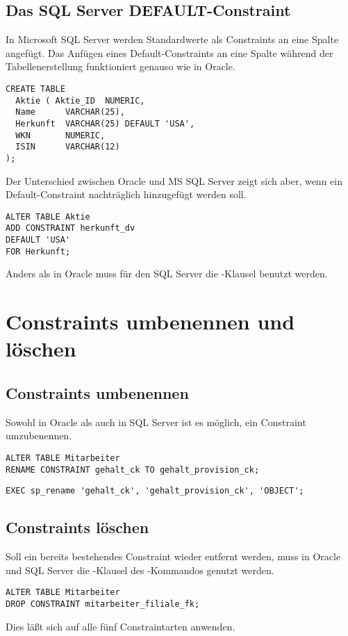       \subsection{Das SQL Server DEFAULT-Constraint}
        In Microsoft SQL Server werden Standardwerte als Constraints an eine
        Spalte angefügt. Das Anfügen eines Default-Constraints an eine Spalte
        während der Tabellenerstellung funktioniert genauso wie in Oracle.
          \begin{lstlisting}[language=ms_sql,caption={Erstellen
          einer Tabelle mit einem Standardwert},label=sql09_18a]
CREATE TABLE
  Aktie ( Aktie_ID  NUMERIC,
  Name      VARCHAR(25),
  Herkunft  VARCHAR(25) DEFAULT 'USA',
  WKN       NUMERIC,
  ISIN      VARCHAR(12)
);
          \end{lstlisting}
          Der Unterschied zwischen Oracle und MS SQL Server zeigt sich aber, wenn ein Default-Constraint nachträglich hinzugefügt werden soll.
          \begin{lstlisting}[language=ms_sql,caption={Tabellenspalte mit
          Standardwert hinzufügen in SQL Server},label=sql09_18b] 
ALTER TABLE Aktie
ADD CONSTRAINT herkunft_dv
DEFAULT 'USA'
FOR Herkunft;
          \end{lstlisting}
          Anders als in Oracle muss für den SQL Server die -Klausel benutzt werden.
    \section{Constraints umbenennen und löschen}
      \subsection{Constraints umbenennen}
        Sowohl in Oracle als auch in SQL Server ist es möglich, ein Constraint umzubenennen.
        \begin{lstlisting}[language=oracle_sql,caption={Ein Constraint umbenennen in Oracle},label=sql09_19]
ALTER TABLE Mitarbeiter
RENAME CONSTRAINT gehalt_ck TO gehalt_provision_ck;
        \end{lstlisting}
        \begin{lstlisting}[language=ms_sql,caption={Ein Constraint umbenennen in SQL Server},label=sql09_20,emphstyle={[9]\color{red}},emph={[9]sp_rename}]
EXEC sp_rename 'gehalt_ck', 'gehalt_provision_ck', 'OBJECT';
        \end{lstlisting}
      \subsection{Constraints löschen}
        Soll ein bereits bestehendes Constraint wieder entfernt werden, muss in Oracle und SQL Server die -Klausel des -Kommandos genutzt werden.
        \begin{lstlisting}[language=oracle_sql,caption={Ein Constraint löschen},label=sql09_21]
ALTER TABLE Mitarbeiter
DROP CONSTRAINT mitarbeiter_filiale_fk;
        \end{lstlisting}
        Dies läßt sich auf alle fünf Constraintarten anwenden.

